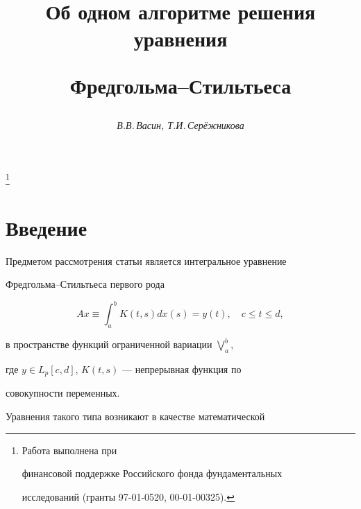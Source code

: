 \author{\it В.В.\,Васин, Т.И.\,Сер\"ежникова}




\title{Об одном алгоритме решения уравнения


Фредгольма--Стильтьеса}


\thanks{Работа выполнена при


финансовой поддержке Российского фонда фундаментальных


исследований (гранты 97-01-0520, 00-01-00325).}





\date{}




\pagestyle{plain} %







\maketitle


\label{begin}








\section{Введение}





Предметом рассмотрения статьи является интегральное уравнение


Фредгольма--Стильтьеса первого рода


\begin{equation}


Ax\equiv\int_a^b K(t,s)dx(s)=y(t),\quad c\le t\le d,


\end{equation}


в пространстве функций ограниченной вариации $\bigvee\limits_a^b$,


где $y\in L_p [c,d]$, $K(t,s)$ --- непрерывная функция по


совокупности переменных.





Уравнения такого типа возникают в качестве математической


